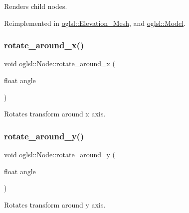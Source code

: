 Renders child nodes. 



Reimplemented in \mbox{\hyperlink{classoglsl_1_1_elevation___mesh_afb39dc1633680dccabb4b8da72ac4733}{oglsl\+::\+Elevation\+\_\+\+Mesh}}, and \mbox{\hyperlink{classoglsl_1_1_model_a22b769c49add4d10774e90466338c695}{oglsl\+::\+Model}}.

\mbox{\label{classoglsl_1_1_node_ab3463958740710e6af2a502ecd10d5ba}} 
\subsubsection{\texorpdfstring{rotate\+\_\+around\+\_\+x()}{rotate\_around\_x()}}
{\footnotesize\ttfamily void oglsl\+::\+Node\+::rotate\+\_\+around\+\_\+x (\begin{DoxyParamCaption}\item[{float}]{angle }\end{DoxyParamCaption})\hspace{0.3cm}{\ttfamily [inline]}}



Rotates transform around x axis. 

\mbox{\label{classoglsl_1_1_node_a18862e40a37f13088bf454eb113e42d6}} 
\subsubsection{\texorpdfstring{rotate\+\_\+around\+\_\+y()}{rotate\_around\_y()}}
{\footnotesize\ttfamily void oglsl\+::\+Node\+::rotate\+\_\+around\+\_\+y (\begin{DoxyParamCaption}\item[{float}]{angle }\end{DoxyParamCaption})\hspace{0.3cm}{\ttfamily [inline]}}



Rotates transform around y axis. 

\mbox{\label{classoglsl_1_1_node_afcd334ef611ba394879cd32be71d4c43}} 
